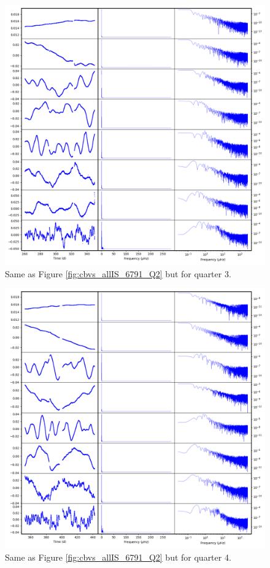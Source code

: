 \begin{figure}
    \centering
    \includegraphics[width=\linewidth]{Chapter_Appended/AppB/cbv_6791_q03.png}
    \caption{Same as Figure \ref{fig:cbvs_allIS_6791_Q2} but for quarter 3.}
    \label{fig:cbvs_allIS_6791_Q03}
\end{figure}


\begin{figure}
    \centering
    \includegraphics[width=\linewidth]{Chapter_Appended/AppB/cbv_6791_q04.png}
    \caption{Same as Figure \ref{fig:cbvs_allIS_6791_Q2} but for quarter 4.}
    \label{fig:cbvs_allIS_6791_Q04}
\end{figure}


